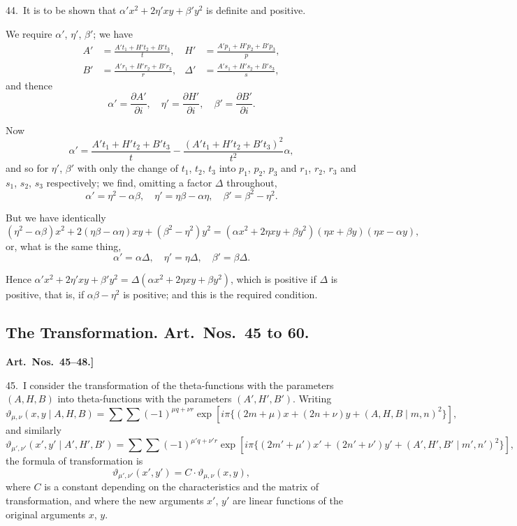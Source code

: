 \documentclass[11pt,a4paper]{article}
\theoremstyle{definition}
\begin{document}
44.\ It is to be shown that $\alpha'x^2 + 2\eta'xy + \beta'y^2$ is definite and positive.

We require $\alpha'$, $\eta'$, $\beta'$; we have
\begin{align*}
A' &= \frac{A't_1 + H't_2 + B't_3}{t}, & H' &= \frac{A'p_1 + H'p_2 + B'p_3}{p},\\
B' &= \frac{A'r_1 + H'r_2 + B'r_3}{r}, & \Delta' &= \frac{A's_1 + H's_2 + B's_3}{s},
\end{align*}
and thence
\[
\alpha' = \frac{\partial A'}{\partial i}, \quad \eta' = \frac{\partial H'}{\partial i}, \quad \beta' = \frac{\partial B'}{\partial i}.
\]

Now
\[
\alpha' = \frac{A't_1 + H't_2 + B't_3}{t} - \frac{(A't_1 + H't_2 + B't_3)^2}{t^2}\alpha,
\]
and so for $\eta'$, $\beta'$ with only the change of $t_1$, $t_2$, $t_3$ into $p_1$, $p_2$, $p_3$ and $r_1$, $r_2$, $r_3$ and $s_1$, $s_2$, $s_3$ respectively; we find, omitting a factor $\Delta$ throughout,
\[
\alpha' = \eta^2 - \alpha\beta, \quad \eta' = \eta\beta - \alpha\eta, \quad \beta' = \beta^2 - \eta^2.
\]

But we have identically
\[
(\eta^2 - \alpha\beta)x^2 + 2(\eta\beta - \alpha\eta)xy + (\beta^2 - \eta^2)y^2 = (\alpha x^2 + 2\eta xy + \beta y^2)(\eta x + \beta y)(\eta x - \alpha y),
\]
or, what is the same thing,
\[
\alpha' = \alpha\Delta, \quad \eta' = \eta\Delta, \quad \beta' = \beta\Delta.
\]

Hence $\alpha'x^2 + 2\eta'xy + \beta'y^2 = \Delta(\alpha x^2 + 2\eta xy + \beta y^2)$, which is positive if $\Delta$ is positive, that is, if $\alpha\beta - \eta^2$ is positive; and this is the required condition.

\bigskip

\subsection*{The Transformation. Art.~Nos.\ 45 to 60.}

\textbf{Art.~Nos.~45--48.]
}

45.\ I consider the transformation of the theta-functions with the parameters $(A, H, B)$ into theta-functions with the parameters $(A', H', B')$. Writing
\[
\vartheta_{\mu,\nu}(x, y \mid A, H, B) = \sum\sum (-1)^{\mu q + \nu r} \exp[i\pi\{(2m + \mu)x + (2n + \nu)y + (A, H, B \mid m, n)^2\}],
\]
and similarly
\[
\vartheta_{\mu',\nu'}(x', y' \mid A', H', B') = \sum\sum (-1)^{\mu' q + \nu' r} \exp[i\pi\{(2m' + \mu')x' + (2n' + \nu')y' + (A', H', B' \mid m', n')^2\}],
\]
the formula of transformation is
\[
\vartheta_{\mu',\nu'}(x', y') = C \cdot \vartheta_{\mu,\nu}(x, y),
\]
where $C$ is a constant depending on the characteristics and the matrix of transformation, and where the new arguments $x'$, $y'$ are linear functions of the original arguments $x$, $y$.
\end{document}
